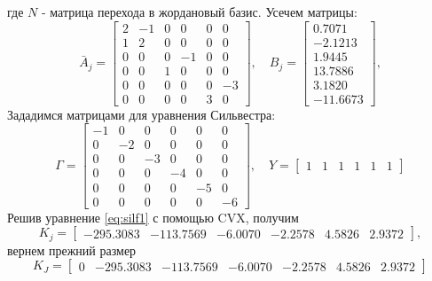 где $N$ - матрица перехода в жордановый базис. Усечем матрицы:
\begin{equation*}
    \bar A_j=\begin{bmatrix}
        2 & -1 &  0 &  0 &  0 &  0 \\
        1 &  2 &  0 &  0 &  0 &  0 \\
         0 &  0 &  0 & -1 &  0 &  0 \\
         0 &  0 &  1 &  0 &  0 &  0 \\
          0 &  0 &  0 &  0 &  0 & -3 \\
         0 &  0 &  0 &  0 &  3 &  0
       \end{bmatrix},\quad
       B_j=\begin{bmatrix}
        0.7071 \\
       -2.1213 \\
        1.9445 \\
        13.7886 \\
        3.1820 \\
       -11.6673
       \end{bmatrix},
\end{equation*}
Зададимся матрицами для уравнения Сильвестра:
\begin{equation*}
    \Gamma=\begin{bmatrix}
        -1 & 0 & 0 & 0 & 0 & 0 \\
         0 & -2 & 0 & 0 & 0 & 0 \\
         0 &  0 & -3 & 0 & 0 & 0 \\
         0 &  0 &  0 & -4 & 0 & 0 \\
         0 &  0 &  0 &  0 & -5& 0 \\
         0 &  0 &  0 &  0 &  0& -6
    \end{bmatrix},\quad
    Y=\begin{bmatrix}
        1 & 1 & 1 & 1 & 1 & 1
    \end{bmatrix}
\end{equation*}
Решив уравнение \eqref{eq:silf1} с помощью CVX, получим
\begin{equation*}
    K_j=\begin{bmatrix}
        -295.3083	&-113.7569&	-6.0070&	-2.2578&	4.5826	&2.9372
    \end{bmatrix},
\end{equation*}
вернем прежний размер
\begin{equation*}
    K_J=\begin{bmatrix}
        0&-295.3083	&-113.7569&	-6.0070&	-2.2578&	4.5826	&2.9372
    \end{bmatrix}
\end{equation*}
